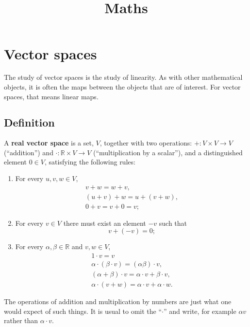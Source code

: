 \documentclass[10pt, a4paper, twocolumn]{article}
\title{Maths}
\newcommand{\R}{\mathbb{R}}
\newcommand{\defn}[1]{\textbf{#1}}
\begin{document}
\maketitle

\section{Vector spaces}
The study of vector spaces is the study of linearity. As with other mathematical
objects, it is often the maps between the objects that are of interest. For
vector spaces, that means linear maps.

\subsection{Definition}
A \defn{real vector space} is a set, $V$, together with two operations: ${+}:V \times
V \to V$ (“addition”) and ${\cdot}:\R \times V \to V$ (“multiplication by a scalar”), and a
distinguished element $ 0\in V$, satisfying the following rules:
\begin{enumerate}
\item
  For every $u, v, w \in V$,
  \begin{equation*}
    \begin{gathered}
      v + w = w + v, \\
      (u + v) + w = u + (v + w), \\
      0 + v = v + 0 = v;
      \end{gathered}
  \end{equation*}
\item For every $v \in V$ there must exist an element $-v$ such that
  \begin{equation*}
    v + (-v) = 0; 
  \end{equation*}
\item For every $\alpha, \beta \in \R$ and $v, w \in V$,
  \begin{equation*}
    \begin{gathered}
      1 \cdot v = v \\
      \alpha \cdot (\beta \cdot v) = (\alpha \beta) \cdot v, \\
      (\alpha + \beta) \cdot v = \alpha \cdot v + \beta \cdot v, \\
      \alpha \cdot (v + w) = \alpha \cdot v + \alpha \cdot w.
    \end{gathered}
  \end{equation*}
\end{enumerate}
The operations of addition and multiplication by numbers are just what one would expect of such
things. It is usual to omit the “$\cdot$” and write, for example $\alpha v$ rather than $\alpha \cdot v$.
\end{document}
